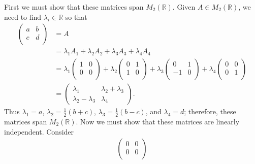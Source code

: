 \begin{example}
    First we must show that these matrices span $M_2(\mathbb{R})$. Given $A \in M_2(\mathbb{R})$, we need to find $\lambda_i \in \mathbb{R}$ so that
    \begin{align*}
        \begin{pmatrix}
            a & b \\
            c & d \\
        \end{pmatrix}
        &= A \\
        &= \lambda_1 A_1 + \lambda_2 A_2 + \lambda_3 A_3 + \lambda_4 A_4 \\
        &= \lambda_1
        \begin{pmatrix}
            1 & 0 \\
            0 & 0 \\
        \end{pmatrix}
        + \lambda_2 
        \begin{pmatrix}
            0 & 1 \\
            1 & 0 \\
        \end{pmatrix}
        + \lambda_3
        \begin{pmatrix}
            0 & 1 \\
            -1 & 0 \\
        \end{pmatrix}
        + \lambda_4
        \begin{pmatrix}
            0 & 0 \\
            0 & 1 \\
        \end{pmatrix}
        \\ 
        &=
        \begin{pmatrix}
            \lambda_1 & \lambda_2 + \lambda_3 \\
            \lambda_2 - \lambda_3 & \lambda_4
        \end{pmatrix}
        .
    \end{align*}
    Thus $\lambda_1 = a$, $\lambda_2 = \frac{1}{2} (b + c)$, $\lambda_3 = \frac{1}{2} (b - c)$, and $\lambda_4 = d$; therefore, these matrices span $M_2(\mathbb{R})$. Now we must show that these matrices are linearly independent. Consider
    \begin{align*}
        \begin{pmatrix}
            0 & 0 \\
            0 & 0 \\
        \end{pmatrix}

\end{align*}
\end{example}
